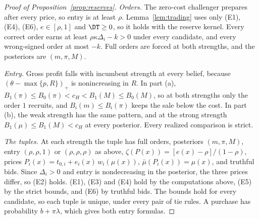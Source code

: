 \begin{proof}[Proof of Proposition~\ref{prop:reserves}]
\emph{Orders.} The zero-cost challenger prepares after every price, so entry is at least \(\rho\). Lemma~\ref{lem:trading}
uses only (E1), (E4), (E6), \(e\in[\rho,1]\) and \(\DT\ge0\), so it holds with the reserve kernel. Every correct order earns
at least \(\rho\kappa\Delta_i-k>0\) under every candidate, and every wrong-signed order at most \(-k\). Full orders are
forced at both strengths, and the posteriors are \((m,\pi,M)\).

\emph{Entry.} Gross profit falls with incumbent strength at every belief, because \((\theta-\max\{p,R\})_+\) is
nonincreasing in \(R\). In part (a), \(B_1(\pi)\le B_0(\pi)<c_H<B_1(M)\le B_0(M)\), so at both strengths only the
order \(1\) recruits, and \(B_i(m)\le B_i(\pi)\) keeps the sale below the cost. In part (b), the weak strength has
the same pattern, and at the strong strength \(B_1(\mu)\le B_1(M)<c_H\) at every posterior. Every realized comparison
is strict.

\emph{The tuples.} At each strength the tuple has full orders, posteriors \((m,\pi,M)\), entry \((\rho,\rho,1)\) or
\((\rho,\rho,\rho)\) as above, \(\zeta(P(x))=[e(x)-\rho]/(1-\rho)\), prices
\(P_i(x)=t_{0,i}+e_i(x)\,w_i(\mu(x))\), \(\bar\mu(P_i(x))=\mu(x)\), and truthful bids. Since \(\Delta_i>0\) and entry is
nondecreasing in the posterior, the three prices differ, so (E2) holds. (E1), (E3) and (E4) hold by the computations
above, (E5) by the strict bounds, and (E6) by truthful bids. The bounds hold for every candidate, so each tuple is
unique, under every pair of tie rules. A purchase has probability \(b+\pi\lambda\), which gives both entry formulas.
\end{proof}

